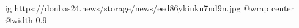  
 
 
 
 

\ifcmt
  ig https://donbas24.news/storage/news/eed86ykiuku7nd9n.jpg
  @wrap center
  @width 0.9
\fi
